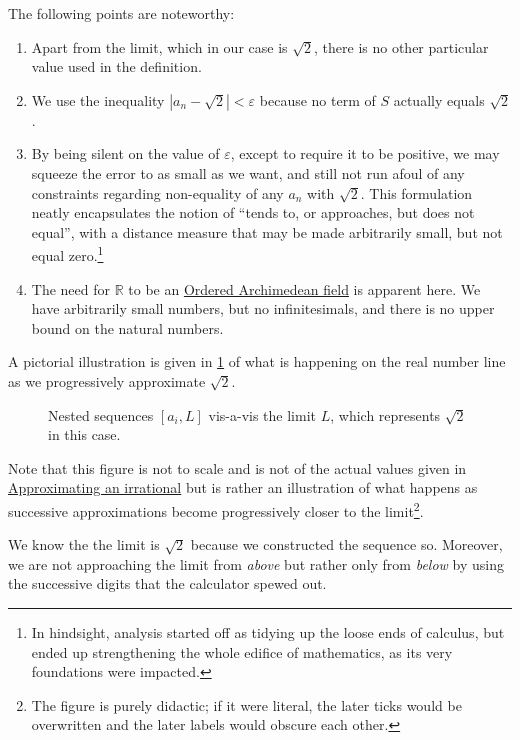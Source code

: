 \documentclass[
  a4paper,
]{article}
\begin{document}
The following points are noteworthy:

\begin{enumerate}
\item
  Apart from the limit, which in our case is \(\sqrt{2}\), there is no
  other particular value used in the definition.
\item
  We use the inequality \(|a_{n} - \sqrt{2}| < \varepsilon\) because no
  term of \(S\) actually equals \(\sqrt{2}\).
\item
  By being silent on the value of \(\varepsilon\), except to require it
  to be positive, we may squeeze the error to as small as we want, and
  still not run afoul of any constraints regarding non-equality of any
  \(a_{n}\) with \(\sqrt{2}\). This formulation neatly encapsulates the
  notion of ``tends to, or approaches, but does not equal'', with a
  distance measure that may be made arbitrarily small, but not equal
  zero.\footnote{In hindsight, analysis started off as tidying up the
    loose ends of calculus, but ended up strengthening the whole edifice
    of mathematics, as its very foundations were impacted.}
\item
  The need for \(\mathbb{R}\) to be an
  \hyperref[ordered-archimedean-field]{Ordered Archimedean field} is
  apparent here. We have arbitrarily small numbers, but no
  infinitesimals, and there is no upper bound on the natural numbers.
\end{enumerate}

A pictorial illustration is given in \cref{fig:nested} of what is
happening on the real number line as we progressively approximate
\(\sqrt{2}\).

\begin{figure}
\centering

\caption{Nested sequences \([a_i, L]\) vis-a-vis the limit \(L\), which
represents \(\sqrt{2}\) in this case.}\label{fig:nested}
\end{figure}

Note that this figure is not to scale and is not of the actual values
given in \hyperref[approximating-an-irrational]{Approximating an
irrational} but is rather an illustration of what happens as successive
approximations become progressively closer to the limit\footnote{The
  figure is purely didactic; if it were literal, the later ticks would
  be overwritten and the later labels would obscure each other.}.

We know the the limit is \(\sqrt{2}\) because we constructed the
sequence so. Moreover, we are not approaching the limit from
\emph{above} but rather only from \emph{below} by using the successive
digits that the calculator spewed out.
\end{document}

